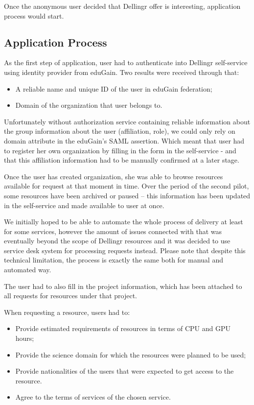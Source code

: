 \documentclass{article}
\begin{document}
Once the anonymous user decided that Dellingr offer is interesting, application process would start. 
\subsection{Application Process}

As the first step of application, user had to authenticate into Dellingr self-service using identity provider from eduGain. Two results were received through that:
\begin{itemize}
    \item A reliable name and unique ID of the user in eduGain federation;
    \item Domain of the organization that user belongs to.
\end{itemize}
Unfortunately without authorization service containing reliable information about the group
information about the user (affiliation, role), we could only rely on domain attribute in the eduGain's SAML assertion. Which meant that user had to register her own organization by filling in the form in the self-service - and that this affiliation information had to be manually confirmed at a later stage.

Once the user has created organization, she was able to browse resources available for request at that moment in time. Over the period of the second pilot, some resources have been archived or paused -- this information has been updated in the self-service and made available to user at once.

We initially hoped to be able to automate the whole process of delivery at least for some services, however the amount of issues connected with that was eventually beyond the scope of Dellingr resources and it was decided to use service desk system for processing requests instead. Please note that despite this technical limitation, the process is exactly the same both for manual and automated way.

The user had to also fill in the project information, which has been attached to all requests for resources under that project.

When requesting a resource, users had to:
\begin{itemize}
    \item Provide estimated requirements of resources in terms of CPU and GPU hours;
    \item Provide the science domain for which the resources were planned to be used;
    \item Provide nationalities of the users that were expected to get access to the resource.
    \item Agree to the terms of services of the chosen service.
\end{itemize}
\end{document}
